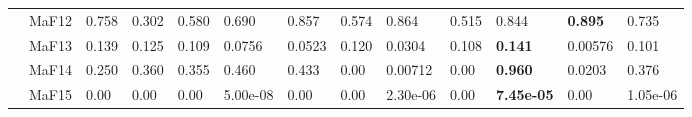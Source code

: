 \documentclass[]{article}
\begin{document}
\begin{landscape}
\begin{table}
\begin{footnotesize}
\begin{tabular}{|l|l|l|l|l|l|l|l|l|l|l|l|l|}
 & MaF12 & 0.758 & 0.302 & 0.580 & 0.690 & \cellcolor{gray95} 0.857 & 0.574 & \cellcolor{gray95} 0.864 & 0.515 & \cellcolor{gray95} 0.844 & \cellcolor{gray95} {\bf 0.895} & 0.735\\
 & MaF13 & \cellcolor{gray95} 0.139 & \cellcolor{gray95} 0.125 & 0.109 & 0.0756 & 0.0523 & \cellcolor{gray95} 0.120 & 0.0304 & 0.108 & \cellcolor{gray95} {\bf 0.141} & 0.00576 & 0.101\\
 & MaF14 & 0.250 & 0.360 & 0.355 & \cellcolor{gray95} 0.460 & \cellcolor{gray95} 0.433 & 0.00 & 0.00712 & 0.00 & \cellcolor{gray95} {\bf 0.960} & 0.0203 & 0.376\\
 & MaF15 & 0.00 & 0.00 & 0.00 & 5.00e-08 & 0.00 & 0.00 & 2.30e-06 & 0.00 & \cellcolor{gray95} {\bf 7.45e-05} & 0.00 & 1.05e-06\\
\hline


\end{tabular}
\end{footnotesize}
\end{table}
\end{landscape}
\end{document}
